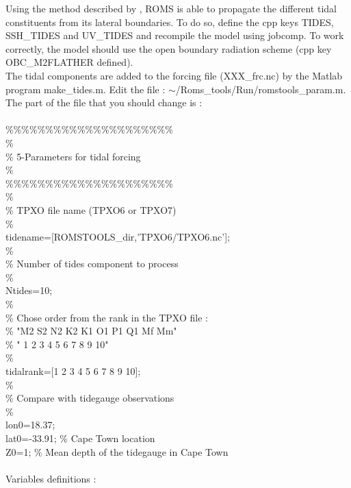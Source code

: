 Using the method described by \citet{Fla76}, ROMS is able to propagate the 
different tidal constituents from its lateral boundaries. To do so, define  
the cpp keys TIDES,  SSH\_TIDES and UV\_TIDES and recompile the model 
using jobcomp. To work correctly, the model should use the \citet{Fla76} 
open boundary radiation scheme (cpp key OBC\_M2FLATHER defined).\\
The tidal components are added to the forcing file (XXX\_frc.nc)
by the Matlab program make\_tides.m.
Edit the file : $\sim$/Roms\_tools/Run/romstools\_param.m.
The part of the file that you should change is :\\
\\
\%\%\%\%\%\%\%\%\%\%\%\%\%\%\%\%\%\%\%\%\%\\
\%\\
\% 5-Parameters for tidal forcing\\
\%\\
\%\%\%\%\%\%\%\%\%\%\%\%\%\%\%\%\%\%\%\%\%\\
\%\\
\% TPXO file name (TPXO6 or TPXO7)\\
\%\\
tidename=[ROMSTOOLS\_dir,'TPXO6/TPXO6.nc'];\\
\%\\
\% Number of tides component to process\\
\%\\
Ntides=10;\\
\%\\
\% Chose order from the rank in the TPXO file :\\
\% "M2 S2 N2 K2 K1 O1 P1 Q1 Mf Mm"\\
\% " 1  2  3  4  5  6  7  8  9 10"\\
\%\\
tidalrank=[1 2 3 4 5 6 7 8 9 10];\\
\%\\
\% Compare with tidegauge observations\\
\%\\
lon0=18.37;\\
lat0=-33.91;   \% Cape Town location\\
Z0=1;          \% Mean depth of the tidegauge in Cape Town\\
\\
Variables definitions :
